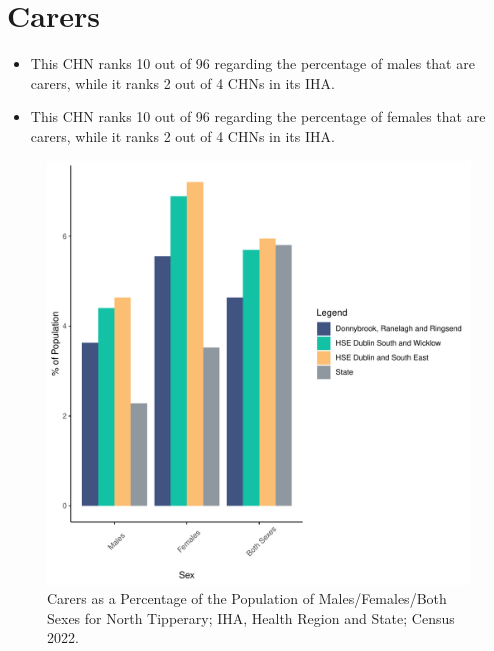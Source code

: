 \documentclass{article}
\begin{document}
\section{Carers}\label{sect:Carers}
\begin{itemize}
\item This CHN ranks  10 out of 96 regarding the percentage of males that are carers, while it ranks   2 out of 4 CHNs in its IHA.
\item This CHN ranks  10 out of 96 regarding the percentage of females that are carers, while it ranks   2 out of 4 CHNs in its IHA.
\end{itemize}
\begin{figure}[H]
	\centering
	\includegraphics[width = 150mm]{../figures/CareED.pdf}
	\caption{Carers as a Percentage of the Population of Males/Females/Both Sexes for North Tipperary; IHA, Health Region and State; Census 2022.}
	\label{fig:2ae19629-1a6a-13a3-e055-000000000001}
	\end{figure}
\end{document}
